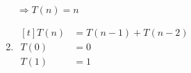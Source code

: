\documentclass[12pt, letterpaper]{article}
\begin{document}
\begin{enumerate}
        $ \Rightarrow T(n) = n $
    \item $ \begin{aligned}[t]
            T(n) &= T(n - 1) + T(n - 2) \\
            T(0) &= 0 \\
            T(1) &= 1
    \end{aligned} $

\end{enumerate}
\end{document}
